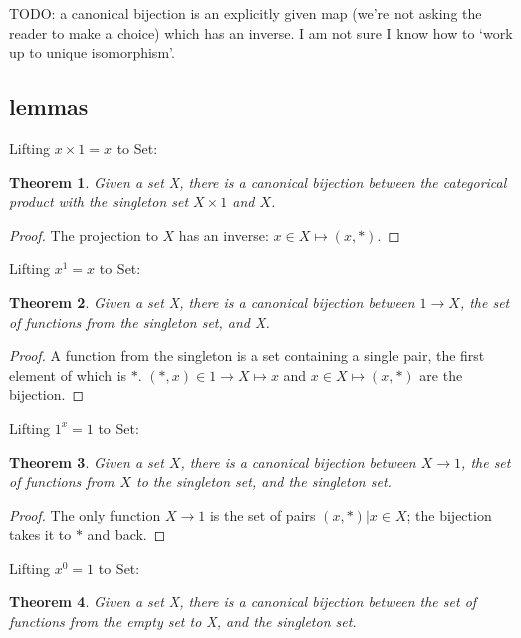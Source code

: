 \documentclass{proc-l}
\newtheorem{theorem}{Theorem}[section]
\theoremstyle{definition}
\theoremstyle{remark}
\numberwithin{equation}{section}
\begin{document}
TODO: a canonical bijection is an explicitly given map (we're not asking the reader to make a choice) which has an inverse.
I am not sure I know how to `work up to unique isomorphism'.

\subsection{lemmas}

Lifting \(x \times 1 = x\) to Set:

\begin{theorem}
Given a set X, there is a canonical bijection between the categorical product with the singleton set \(X \times 1\) and \(X\).
\end{theorem}

\begin{proof}
The projection to \(X\) has an inverse: \(x \in X \mapsto (x, *)\). 
\end{proof}

Lifting \(x^1 = x\) to Set:

\begin{theorem}
Given a set X, there is a canonical bijection between \(1 \to X\), the set of functions from the singleton set, and X.
\end{theorem}

\begin{proof}
A function from the singleton is a set containing a single pair, the first element of which is \(*\). \({(*, x)} \in 1 \to X \mapsto x\) and \(x \in X \mapsto {(x, *)}\) are the bijection.
\end{proof}

Lifting \(1^x = 1\) to Set:

\begin{theorem}
Given a set \(X\), there is a canonical bijection between \(X \to 1\), the set of functions from \(X\) to the singleton set, and the singleton set.
\end{theorem}

\begin{proof}
The only function \(X \to 1\) is the set of pairs \({ (x, *) | x \in X }\); the bijection takes it to \(*\) and back.
\end{proof}

Lifting \(x^0 = 1\) to Set:

\begin{theorem}
Given a set X, there is a canonical bijection between the set of functions from the empty set to X, and the singleton set.
\end{theorem}
\end{document}
